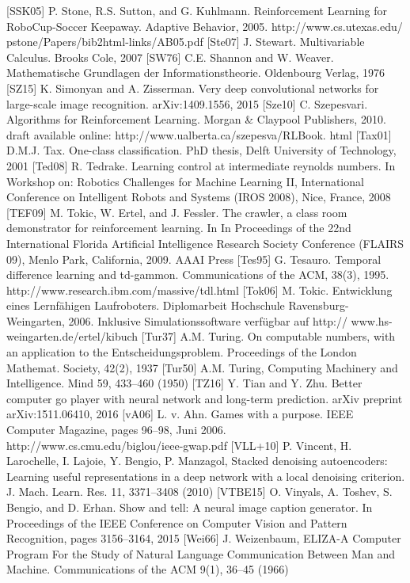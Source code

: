 \documentclass[10pt]{book}
\begin{document}
[SSK05] P. Stone, R.S. Sutton, and G. Kuhlmann. Reinforcement Learning for RoboCup-Soccer Keepaway. Adaptive Behavior, 2005. http://www.cs.utexas.edu/ pstone/Papers/bib2html-links/AB05.pdf
[Ste07] J. Stewart. Multivariable Calculus. Brooks Cole, 2007
[SW76] C.E. Shannon and W. Weaver. Mathematische Grundlagen der Informationstheorie. Oldenbourg Verlag, 1976
[SZ15] K. Simonyan and A. Zisserman. Very deep convolutional networks for large-scale image recognition. arXiv:1409.1556, 2015
[Sze10] C. Szepesvari. Algorithms for Reinforcement Learning. Morgan \& Claypool Publishers, 2010. draft available online: http://www.ualberta.ca/szepesva/RLBook. html
[Tax01] D.M.J. Tax. One-class classification. PhD thesis, Delft University of Technology, 2001
[Ted08] R. Tedrake. Learning control at intermediate reynolds numbers. In Workshop on: Robotics Challenges for Machine Learning II, International Conference on Intelligent Robots and Systems (IROS 2008), Nice, France, 2008
[TEF09] M. Tokic, W. Ertel, and J. Fessler. The crawler, a class room demonstrator for reinforcement learning. In In Proceedings of the 22nd International Florida Artificial Intelligence Research Society Conference (FLAIRS 09), Menlo Park, California, 2009. AAAI Press
[Tes95] G. Tesauro. Temporal difference learning and td-gammon. Communications of the ACM, 38(3), 1995. http://www.research.ibm.com/massive/tdl.html
[Tok06] M. Tokic. Entwicklung eines Lernfähigen Laufroboters. Diplomarbeit Hochschule Ravensburg-Weingarten, 2006. Inklusive Simulationssoftware verfügbar auf http:// www.hs-weingarten.de/ertel/kibuch
[Tur37] A.M. Turing. On computable numbers, with an application to the Entscheidungsproblem. Proceedings of the London Mathemat. Society, 42(2), 1937
[Tur50] A.M. Turing, Computing Machinery and Intelligence. Mind 59, 433–460 (1950)
[TZ16] Y. Tian and Y. Zhu. Better computer go player with neural network and long-term prediction. arXiv preprint arXiv:1511.06410, 2016
[vA06] L. v. Ahn. Games with a purpose. IEEE Computer Magazine, pages 96–98, Juni 2006. http://www.cs.cmu.edu/biglou/ieee-gwap.pdf
[VLL+10] P. Vincent, H. Larochelle, I. Lajoie, Y. Bengio, P. Manzagol, Stacked denoising autoencoders: Learning useful representations in a deep network with a local denoising criterion. J. Mach. Learn. Res. 11, 3371–3408 (2010)
[VTBE15] O. Vinyals, A. Toshev, S. Bengio, and D. Erhan. Show and tell: A neural image caption generator. In Proceedings of the IEEE Conference on Computer Vision and Pattern Recognition, pages 3156–3164, 2015
[Wei66] J. Weizenbaum, ELIZA-A Computer Program For the Study of Natural Language Communication Between Man and Machine. Communications of the ACM 9(1), 36–45 (1966)
\end{document}
